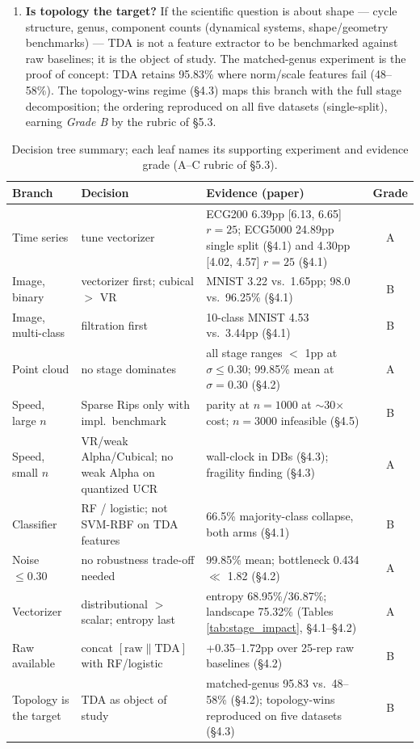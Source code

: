\documentclass[12pt, a4paper]{report}
\theoremstyle{definition}
\theoremstyle{plain}
\theoremstyle{remark}
\begin{document}
\begin{enumerate}
  \item \textbf{Is topology the target?} If the scientific question is
    about shape --- cycle structure, genus, component counts (dynamical
    systems, shape/geometry benchmarks) --- TDA is not a feature extractor
    to be benchmarked against raw baselines; it is the object of study.
    The matched-genus experiment is the proof of concept: TDA retains
    95.83\% where norm/scale features fail (48--58\%). The topology-wins
    regime (\S4.3) maps this branch with the full
    stage decomposition; the ordering reproduced on all five datasets
    (single-split), earning \emph{Grade B} by the rubric of \S5.3.
\end{enumerate}

\begin{table}[H]
  \centering
  \caption{Decision tree summary; each leaf names its supporting
  experiment and evidence grade (A--C rubric of \S5.3).}
  \label{tab:decision_tree}
  \small
  \begin{tabularx}{\textwidth}{@{}l X X c@{}}
    \toprule
    Branch & Decision & Evidence (paper) & Grade \\
    \midrule
    Time series & tune vectorizer & ECG200 6.39pp [6.13, 6.65] $r{=}25$; ECG5000 24.89pp single split (\S4.1) and 4.30pp [4.02, 4.57] $r{=}25$ (\S4.1) & A \\
    Image, binary & vectorizer first; cubical $>$ VR & MNIST 3.22 vs.\ 1.65pp; 98.0 vs.\ 96.25\% (\S4.1) & B \\
    Image, multi-class & filtration first & 10-class MNIST 4.53 vs.\ 3.44pp (\S4.1) & B \\
    Point cloud & no stage dominates & all stage ranges $<$ 1pp at $\sigma \le 0.30$; 99.85\% mean at $\sigma{=}0.30$ (\S4.2) & A \\
    Speed, large $n$ & Sparse Rips only with impl.\ benchmark & parity at $n{=}1000$ at $\sim$30$\times$ cost; $n{=}3000$ infeasible (\S4.5) & B \\
    Speed, small $n$ & VR/weak Alpha/Cubical; no weak Alpha on quantized UCR & wall-clock in DBs (\S4.3); fragility finding (\S4.3) & A \\
    Classifier & RF / logistic; not SVM-RBF on TDA features & 66.5\% majority-class collapse, both arms (\S4.1) & B \\
    Noise $\le 0.30$ & no robustness trade-off needed & 99.85\% mean; bottleneck 0.434 $\ll$ 1.82 (\S4.2) & A \\
    Vectorizer & distributional $>$ scalar; entropy last & entropy 68.95\%/36.87\%; landscape 75.32\% (Tables \ref{tab:stage_impact}, \S4.1--\S4.2) & A \\
    Raw available & concat $[\text{raw}\|\text{TDA}]$ with RF/logistic & +0.35--1.72pp over 25-rep raw baselines (\S4.2) & B \\
    Topology is the target & TDA as object of study & matched-genus 95.83 vs.\ 48--58\% (\S4.2); topology-wins reproduced on five datasets (\S4.3) & B \\
    \bottomrule
  \end{tabularx}
\end{table}
\end{document}
